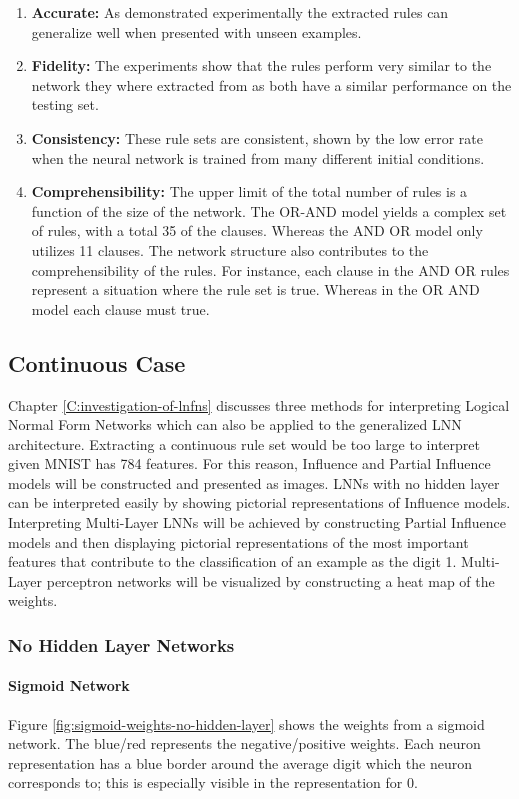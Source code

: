 \begin{enumerate}
	\item \textbf{Accurate:} As demonstrated experimentally the extracted rules can generalize well when presented with unseen examples.
	\item \textbf{Fidelity:} The experiments show that the rules perform very similar to the network they where extracted from as both have a similar performance on the testing set.
	\item \textbf{Consistency:} These rule sets are consistent, shown by the low error rate when the neural network is trained from many different initial conditions.
	\item \textbf{Comprehensibility:} The upper limit of the total number of rules is a function of the size of the network. The OR-AND model yields a complex set of rules, with a total 35 of the clauses. Whereas the AND OR model only utilizes 11 clauses. The network structure also contributes to the comprehensibility of the rules. For instance, each clause in the AND OR rules represent a situation where the rule set is true. Whereas in the OR AND model each clause must true.
\end{enumerate}

\subsection{Continuous Case}
Chapter \ref{C:investigation-of-lnfns} discusses three methods for interpreting Logical Normal Form Networks which can also be applied to the generalized LNN architecture. Extracting a continuous rule set would be too large to interpret given MNIST has 784 features. For this reason, Influence and Partial Influence models will be constructed and presented as images. LNNs with no hidden layer can be interpreted easily by showing pictorial representations of Influence models. Interpreting Multi-Layer LNNs will be achieved by constructing Partial Influence models and then displaying pictorial representations of the most important features that contribute to the classification of an example as the digit 1. Multi-Layer perceptron networks will be visualized by constructing a heat map of the weights.

\subsubsection{No Hidden Layer Networks}

\paragraph{Sigmoid Network}
Figure \ref{fig:sigmoid-weights-no-hidden-layer} shows the weights from a sigmoid network. The blue/red represents the negative/positive weights. Each neuron representation has a blue border around the average digit which the neuron corresponds to; this is especially visible in the representation for 0.

